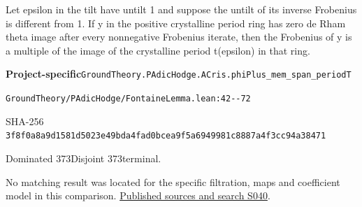 
\begin{formalstatement}[D245]\label{decomp:D245}
Let epsilon in the tilt have untilt 1 and suppose the untilt of its inverse Frobenius is different from 1. If y in the positive crystalline period ring has zero de Rham theta image after every nonnegative Frobenius iterate, then the Frobenius of y is a multiple of the image of the crystalline period t(epsilon) in that ring.
\end{formalstatement}
{\small\raggedright\noindent\textsf{\bfseries Project-specific}\quad \nolinkurl{GroundTheory.PAdicHodge.ACris.phiPlus_mem_span_periodT}\par\noindent \nolinkurl{GroundTheory/PAdicHodge/FontaineLemma.lean:42--72}\par\noindent SHA-256 \nolinkurl{3f8f0a8a9d1581d5023e49bda4fad0bcea9f5a6949981c8887a4f3cc94a38471}\par\noindent Dominated 373\quad Disjoint 373\quad terminal.\par}
No matching result was located for the specific filtration, maps and coefficient model in this comparison.
\hyperref[lit:S040]{Published sources and search S040}.
